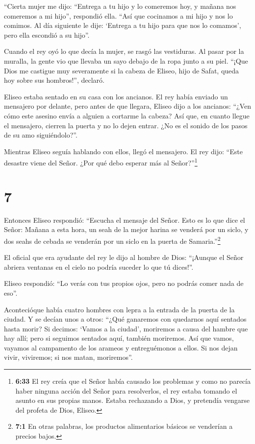 ``Cierta mujer me dijo: ``Entrega a tu hijo y lo comeremos hoy, y mañana
nos comeremos a mi hijo'', respondió ella.  ``Así que
cocinamos a mi hijo y nos lo comimos. Al día siguiente le dije: `Entrega
a tu hijo para que nos lo comamos', pero ella escondió a su hijo''.

 Cuando el rey oyó lo que decía la mujer, se rasgó las
vestiduras. Al pasar por la muralla, la gente vio que llevaba un sayo
debajo de la ropa junto a su piel.  ``¡Que Dios me castigue
muy severamente si la cabeza de Eliseo, hijo de Safat, queda hoy sobre
sus hombros!'', declaró.

 Eliseo estaba sentado en su casa con los ancianos. El rey
había enviado un mensajero por delante, pero antes de que llegara,
Eliseo dijo a los ancianos: ``¿Ven cómo este asesino envía a alguien a
cortarme la cabeza? Así que, en cuanto llegue el mensajero, cierren la
puerta y no lo dejen entrar. ¿No es el sonido de los pasos de su amo
siguiéndolo?''.

 Mientras Eliseo seguía hablando con ellos, llegó el
mensajero. El rey dijo: ``Este desastre viene del Señor. ¿Por qué debo
esperar más al Señor?''\footnote{\textbf{6:33} El rey creía que el Señor
  había causado los problemas y como no parecía haber ninguna acción del
  Señor para resolverlos, el rey estaba tomando el asunto en sus propias
  manos. Estaba rechazando a Dios, y pretendía vengarse del profeta de
  Dios, Eliseo.}

\hypertarget{section-6}{%
\section{7}\label{section-6}}

 Entonces Eliseo respondió: ``Escucha el mensaje del Señor.
Esto es lo que dice el Señor: Mañana a esta hora, un seah de la mejor
harina se venderá por un siclo, y dos seahs de cebada se venderán por un
siclo en la puerta de Samaria.''\footnote{\textbf{7:1} En otras
  palabras, los productos alimentarios básicos se venderían a precios
  bajos.}

 El oficial que era ayudante del rey le dijo al hombre de
Dios: ``¡Aunque el Señor abriera ventanas en el cielo no podría suceder
lo que tú dices!''.

Eliseo respondió: ``Lo verás con tus propios ojos, pero no podrás comer
nada de eso''.

 Acontecióque había cuatro hombres con lepra a la entrada de
la puerta de la ciudad. Y se decían unos a otros: ``¿Qué ganaremos con
quedarnos aquí sentados hasta morir?  Si decimos: `Vamos a
la ciudad', moriremos a causa del hambre que hay allí; pero si seguimos
sentados aquí, también moriremos. Así que vamos, vayamos al campamento
de los arameos y entreguémonos a ellos. Si nos dejan vivir, viviremos;
si nos matan, moriremos''.

